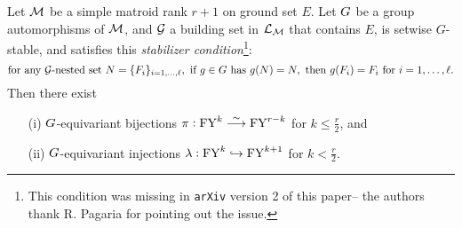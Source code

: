 \begin{thm}
\label{main-theorem}
Let $\mathcal{M}$ be a simple matroid rank $r+1$ on ground set $E$.  Let $G$
be a group automorphisms of $\mathcal{M}$, and $\mathcal{G}$ a building set in
$\mathcal{L}_{\mathcal{M}}$
that contains $E$, is setwise $G$-stable, and satisfies this
{\it stabilizer condition}\footnote{This condition was missing in {\tt arXiv} version 2 of this paper--  the authors 
thank R. Pagaria for pointing out the issue.}:
\begin{equation}
\label{eq:stabilizer-condition}
  \text{for any }\mathcal{G}\text{-nested set }
   N=\{F_i\}_{i=1,\ldots,\ell}, \text{ if }g \in G\text{ has } 
    g(N)=N, \text{ then }g(F_i)=F_i \text{ for } i=1,\ldots,\ell.
\end{equation}
Then there exist
\begin{itemize}
\item[(i)]
$G$-equivariant  bijections 
$
\pi: \mathrm{FY}^k  \overset{\sim}{\longrightarrow}  \mathrm{FY}^{r-k}
$ for $k \leq \frac{r}{2}$, and
\item[(ii)]
$G$-equivariant injections
$
\lambda: \mathrm{FY}^k  \hookrightarrow  \mathrm{FY}^{k+1}
$
for $k < \frac{r}{2}$.
\end{itemize}
\end{thm}


